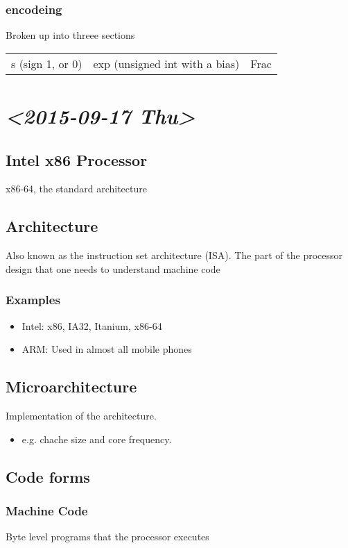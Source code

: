 \documentclass[11pt]{article}
\begin{document}
\subsubsection{encodeing}
\label{sec-4-3-2}
Broken up into threee sections 
\begin{center}
\begin{tabular}{lll}
s (sign 1, or 0) & exp (unsigned int with a bias) & Frac\\
\end{tabular}
\end{center}

\section{\textit{<2015-09-17 Thu>}}
\label{sec-5}
\subsection{Intel x86 Processor}
\label{sec-5-1}
x86-64, the standard architecture 
\subsection{Architecture}
\label{sec-5-2}
Also known as the instruction set architecture (ISA). 
The part of the processor design that one needs to understand machine code
\subsubsection{Examples}
\label{sec-5-2-1}
\begin{itemize}
\item Intel: x86, IA32, Itanium, x86-64
\item ARM: Used in almost all mobile phones
\end{itemize}
\subsection{Microarchitecture}
\label{sec-5-3}
Implementation of the architecture.
\begin{itemize}
\item e.g. chache size and core frequency.
\end{itemize}
\subsection{Code forms}
\label{sec-5-4}
\subsubsection{Machine Code}
\label{sec-5-4-1}
Byte level programs that the processor executes
\end{document}
